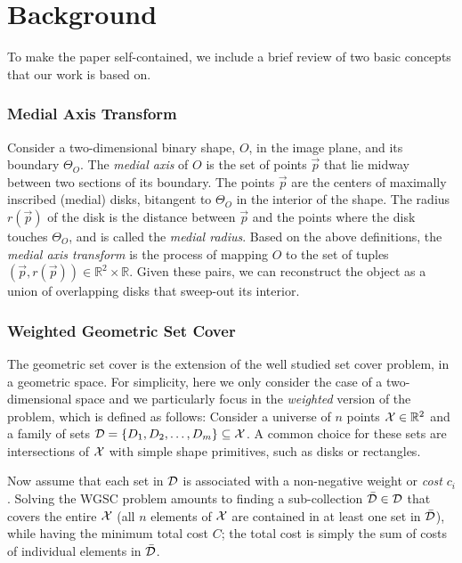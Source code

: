 \documentclass[10pt,twocolumn,letterpaper]{article}
\begin{document}
\section{Background}\label{sec:background}
To make the paper self-contained, we include a brief review of two basic concepts that our work is based on.

\subsubsection*{Medial Axis Transform}
Consider a two-dimensional binary shape, $O$, in the image plane, and its boundary $\Theta_O$.
The \emph{medial axis} of $O$ is the set of points $\vec{p}$ that lie midway between two sections of 
its boundary. The points $\vec{p}$ are the centers of maximally inscribed (medial) disks, bitangent to $\Theta_O$
in the interior of the shape. The radius $r(\vec{p})$ of the disk is the distance between $\vec{p}$ and 
the points where the disk touches $\Theta_O$, and is called the \emph{medial radius}.
Based on the above definitions, the \emph{medial axis transform} is the process of 
mapping $O$ to the set of tuples $(\vec{p},r(\vec{p})) \in \mathbb{R}^2 \times \mathbb{R}$.
Given these pairs, we can reconstruct the object as a union of overlapping disks that sweep-out 
its interior. 

\subsubsection*{Weighted Geometric Set Cover}
The geometric set cover is the extension of the well studied set cover problem, in a geometric space.
For simplicity, here we only consider the case of a two-dimensional space and we particularly focus in the 
\emph{weighted} version of the problem, which is defined as follows:
Consider a universe of $n$ points $\mathcal{X} \in \mathbb{R}^2$ and a family of sets 
$\mathcal{D} = \{D_1,D_2,\ldots,D_m\} \subseteq \mathcal{X}$. 
A common choice for these sets are intersections of $\mathcal{X}$ with simple shape primitives, such as disks or rectangles.

Now assume that each set in $\mathcal{D}$ is associated with a non-negative weight or \emph{cost} $c_i$.
Solving the WGSC problem amounts to finding a sub-collection $\bar{\mathcal{D}} \in \mathcal{D}$ that covers the entire $\mathcal{X}$
(all $n$ elements of $\mathcal{X}$ are contained in at least one set in $\bar{\mathcal{D}}$), while having the minimum
total cost $C$; the total cost is simply the sum of costs of individual elements in $\bar{\mathcal{D}}$.
\end{document}
